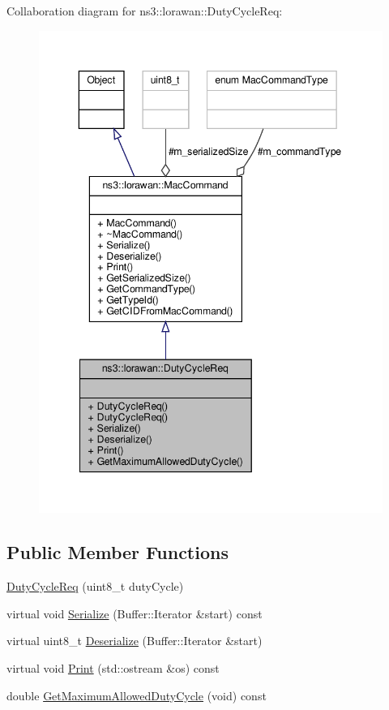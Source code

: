 Collaboration diagram for ns3\+:\+:lorawan\+:\+:Duty\+Cycle\+Req\+:
\nopagebreak
\begin{figure}[H]
\begin{center}
\leavevmode
\includegraphics[width=343pt]{classns3_1_1lorawan_1_1DutyCycleReq__coll__graph}
\end{center}
\end{figure}
\subsection*{Public Member Functions}
\begin{DoxyCompactItemize}
\item 
\hyperlink{classns3_1_1lorawan_1_1DutyCycleReq_aa940e6c73680a6eadfa976d08b56f92c}{Duty\+Cycle\+Req} (uint8\+\_\+t duty\+Cycle)
\item 
virtual void \hyperlink{classns3_1_1lorawan_1_1DutyCycleReq_ae8bd08eaf66d3a83f4c972d6317bc7dd}{Serialize} (Buffer\+::\+Iterator \&start) const
\item 
virtual uint8\+\_\+t \hyperlink{classns3_1_1lorawan_1_1DutyCycleReq_ac158ec7e1539555825e2651ee176c7a5}{Deserialize} (Buffer\+::\+Iterator \&start)
\item 
virtual void \hyperlink{classns3_1_1lorawan_1_1DutyCycleReq_a8d0d86de5e54eab057bcdd9b79c97aa9}{Print} (std\+::ostream \&os) const
\item 
double \hyperlink{classns3_1_1lorawan_1_1DutyCycleReq_ab42bcc06f2f90bac5aaf3a267fed20e8}{Get\+Maximum\+Allowed\+Duty\+Cycle} (void) const
\end{DoxyCompactItemize}
